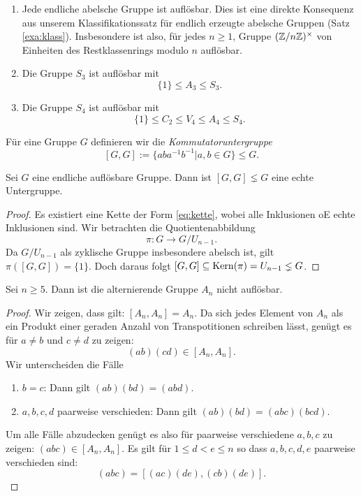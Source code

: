 \documentclass{book}
\begin{document}
\begin{exas}
    \label{exas:auflösbar}
    \begin{enumerate}
        \item Jede endliche abelsche Gruppe ist auflösbar. Dies ist eine
            direkte Konsequenz aus unserem Klassifikationssatz für endlich
            erzeugte abelsche Gruppen (Satz \ref{exa:klass}). Insbesondere ist
            also, für jedes $n \ge 1$, Gruppe $(\mathbb{Z}/n\mathbb{Z})^{\times}$ von
            Einheiten des Restklassenrings modulo $n$ auflösbar. 
        \item Die Gruppe $S_3$ ist auflösbar mit
            \[
                \{1\} \le A_3 \le S_3.
            \]
        \item Die Gruppe $S_4$ ist auflösbar mit
            \[
                \{1\} \le C_2 \le V_4 \le A_4 \le S_4.
            \]
    \end{enumerate}
\end{exas}

Für eine Gruppe $G$ definieren wir die {\em Kommutatoruntergruppe}
\[
    [G,G] := \{aba^{-1}b^{-1} | a,b \in G\} \le G. 
\]

\begin{lem}
    \label{lem:auf}
    Sei $G$ eine endliche auflösbare Gruppe. Dann ist $[G,G] \lneq G$ eine
    echte Untergruppe. 
\end{lem}
\begin{proof}
    Es existiert eine Kette der Form \eqref{eq:kette}, wobei alle Inklusionen
    oE echte Inklusionen sind. Wir betrachten die Quotientenabbildung
    \[
        \pi: G \to G/U_{n-1}.
    \]
    Da $G/U_{n-1}$ als zyklische Gruppe insbesondere abelsch ist, gilt $\pi([G,G])
    = \{1\}$. Doch daraus folgt $[G,G] \subseteq \operatorname{Kern}(\pi) = U_{n-1} \lneq G$. 
\end{proof}

\begin{thm}
    \label{thm:annot}
    Sei $n \ge 5$. Dann ist die alternierende Gruppe $A_n$ nicht auflösbar. 
\end{thm}
\begin{proof}
    Wir zeigen, dass gilt: $[A_n,A_n] = A_n$. Da sich jedes Element von $A_n$
    als ein Produkt einer geraden Anzahl von Transpotitionen schreiben lässt,
    genügt es für $a \neq b$ und $c \neq d$ zu zeigen:
    \[
        (ab)(cd) \in [A_n,A_n].
    \]
    Wir unterscheiden die Fälle
    \begin{enumerate}[label= \arabic *.]
        \item $b = c$: Dann gilt $(ab)(bd) = (abd)$. 
        \item $a,b,c,d$ paarweise verschieden: Dann gilt $(ab)(bd) = (abc)(bcd)$. 
    \end{enumerate}
    Um alle Fälle abzudecken genügt es also für paarweise verschiedene $a,b,c$
    zu zeigen: $(abc) \in [A_n,A_n]$. Es gilt für $1 \le d < e \le n$ so dass
    $a,b,c,d,e$ paarweise verschieden sind: 
    \[
        (abc) = [(ac)(de),(cb)(de)].
    \]
\end{proof}
\end{document}
